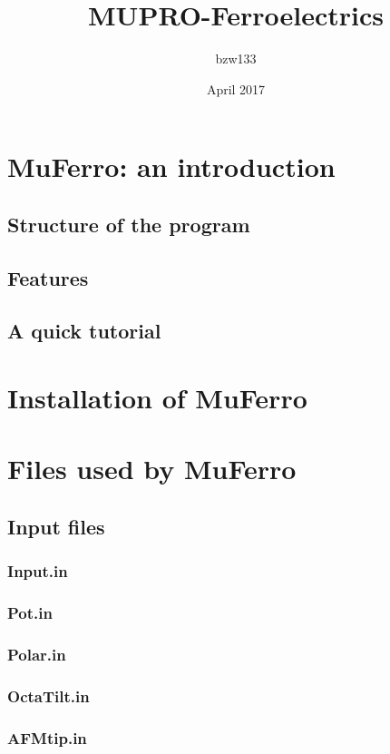 \documentclass{article}
\title{MUPRO-Ferroelectrics}
\author{bzw133 }
\date{April 2017}
\begin{document}
\maketitle

\clearpage{}

{
\centering
\tableofcontents
}

\clearpage{}

\section{MuFerro: an introduction}
\subsection{Structure of the program}
\subsection{Features}
\subsection{A quick tutorial}

\section{Installation of MuFerro}

\section{Files used by MuFerro}
\subsection{Input files}
\subsubsection{Input.in}
\subsubsection{Pot.in}
\subsubsection{Polar.in} 
\subsubsection{OctaTilt.in}
\subsubsection{AFMtip.in}
\end{document}
